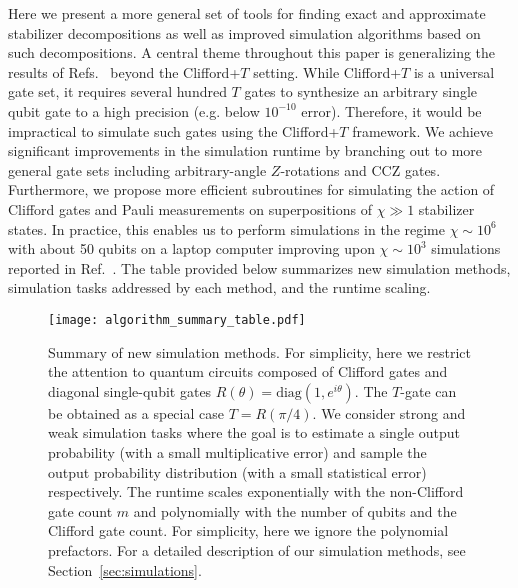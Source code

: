 Here we present a more general set of tools for finding exact and approximate stabilizer decompositions 
as well as improved simulation algorithms based on such decompositions.
A central theme throughout this paper  is generalizing the results  of Refs.~\cite{Bravyi16stabRank,bravyi2016improved}
beyond the Clifford+$T$ setting.  While Clifford+$T$ is a universal gate set, it requires several hundred $T$ gates to synthesize an arbitrary single qubit gate to a high precision (e.g. below $10^{-10}$ error).   Therefore, it would be impractical to simulate such gates using the Clifford+$T$ framework.  We achieve
significant improvements in the simulation runtime by branching out to more general gate sets
including arbitrary-angle $Z$-rotations and CCZ gates. 
Furthermore, we propose more efficient subroutines for simulating the action of Clifford gates
and Pauli measurements on superpositions of $\chi\gg 1$ stabilizer states. 
In practice, this enables us to perform simulations in the regime $\chi \sim 10^6$
with about 50 qubits
on a laptop computer improving upon $\chi\sim 10^3$ simulations reported in
Ref.~\cite{bravyi2016improved}.
The table provided below summarizes new simulation methods,
simulation tasks addressed by each method, and the runtime scaling. 
\begin{figure}[h]
	\texttt{[image: algorithm\_summary\_table.pdf]}
	\caption{Summary of new simulation methods.
	For simplicity, here we restrict the
	attention to quantum circuits composed of Clifford gates and diagonal single-qubit gates
	$R(\theta)=\mathrm{diag}(1,e^{i\theta})$. The $T$-gate can be obtained as a special
	case $T=R(\pi/4)$. We consider strong and weak simulation tasks where the goal is to
	estimate a single output probability (with a small multiplicative error) and
	sample the output probability distribution (with a small  statistical error)
	respectively.
	The runtime scales exponentially with the non-Clifford gate count $m$
	and polynomially with the number of qubits and the Clifford gate count. For simplicity, here
	we ignore the polynomial prefactors. For a detailed description of our simulation methods, 
	see Section~\ref{sec:simulations}.}
	\label{summary_table}
\end{figure}


